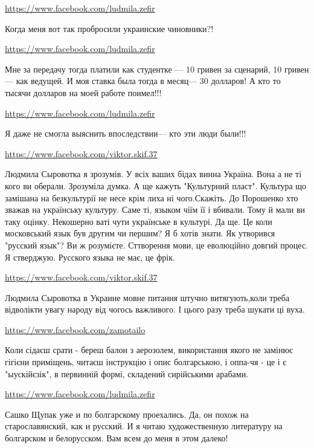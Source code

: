 \documentclass[a4paper,11pt]{extreport}
\begin{document}
\begin{itemize}
\begin{itemize}
\url{https://www.facebook.com/ludmila.zefir}

Когда меня вот так пробросили украинские чиновники?!

\url{https://www.facebook.com/ludmila.zefir}

Мне за передачу тогда платили как студентке — 10 гривен за сценарий, 10 гривен— как ведущей. И моя ставка была тогда в месяц— 30 долларов! А кто то тысячи долларов на моей работе поимел!!!

\url{https://www.facebook.com/ludmila.zefir}

Я даже не смогла выяснить впоследствии— кто эти люди были!!!

\url{https://www.facebook.com/viktor.skif.37}

Людмила Сыровотка я зрозумів. У всіх ваших бідах винна Україна. Вона а не ті кого ви оберали. Зрозуміла думка. А ще кажуть "Культурний пласт". Культура що замішана на безкультурії не несе крім лиха ні чого.Скажіть. До Порошенко хто зважав на українську культуру. Саме ті, языком чіїм її і вбивали. Тому й мали ви таку оцінку. Некошерно ваті чути українське в культурі.
Да ще. Це коли московський язык був другим чи першим?
Я б хотів знати. Як утворився "русский язык"? Ви ж розумієте. Сттворення мови, це еволюційно довгий процес. Я стверджую. Русского языка не має, це фрік.

\url{https://www.facebook.com/viktor.skif.37}

Людмила Сыровотка в Украине мовне питання штучно витягують,коли треба відволікти увагу народу від чогось важливого. І цього разу треба шукати ці вуха.

\end{itemize}
\url{https://www.facebook.com/zamotailo}

Коли сідаєш срати - береш балон з аерозолем, використання якого не замінює гігієни приміщень, читаєш інструкцію і опис болгарською, і оппа-чя - це і є "ыускійєзік", в первинній формі, складений сирійськими арабами.

\begin{itemize}
\url{https://www.facebook.com/ludmila.zefir}

Сашко Щупак уже и по болгарскому проехались. Да, он похож на старославянский, как и русский. И я читаю художественную литературу на болгарском и белорусском. Вам всем до меня в этом далеко!


\end{itemize}
\end{itemize}
\end{document}
